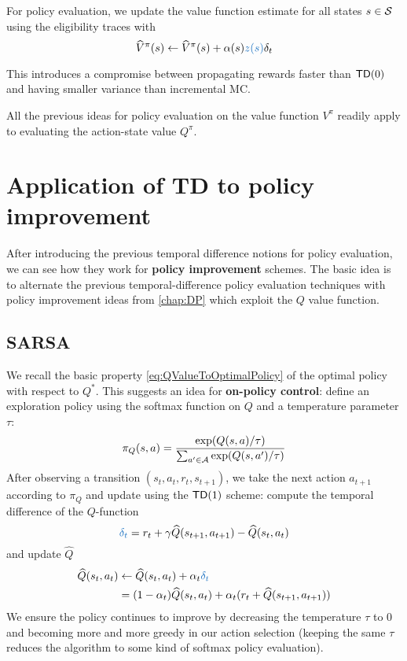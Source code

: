 \documentclass[../course-notes.tex]{subfiles}
\begin{document}
For policy evaluation, we update the value function estimate for all states $s\in\mathcal{S}$ using the eligibility traces with
\begin{equation}
	\widehat{V}^\pi(s) \leftarrow
	\widehat{V}^\pi(s) + \alpha(s){\bluefont z(s)}\delta_t
\end{equation}



This introduces a compromise between propagating rewards faster than $\mathsf{TD}(0)$ and having smaller variance than incremental MC.


\begin{remark}
	All the previous ideas for policy evaluation on the value function $V^\pi$ readily apply to evaluating the action-state value $Q^\pi$.
\end{remark}



\section{Application of TD to policy improvement}

After introducing the previous temporal difference notions for policy evaluation, we can see how they work for \textbf{policy improvement} schemes. The basic idea is to alternate the previous temporal-difference policy evaluation techniques with policy improvement ideas from \cref{chap:DP} which exploit the $Q$ value function.

\subsection{SARSA}

We recall the basic property \eqref{eq:QValueToOptimalPolicy} of the optimal policy with respect to $Q^*$. This suggests an idea for \textbf{on-policy control}: define an exploration policy using the softmax function on $Q$ and a temperature parameter $\tau$:
\[
	\pi_Q(s,a) =
	\frac{\exp(Q(s,a)/\tau)}{
		\sum_{a'\in\mathcal{A}} \exp(Q(s,a')/\tau)
	}
\]
After observing a transition $(s_t, a_t, r_t, s_{t+1})$, we take the next action $a_{t+1}$ according to $\pi_Q$ and update using the $\mathsf{TD}(1)$ scheme: compute the temporal difference of the $Q$-function
\begin{equation}\label{eq:QfuncTDerror}
	{\bluefont \delta_t} = r_t + \gamma \widehat{Q}(s_{t+1}, a_{t+1}) - \widehat{Q}(s_t, a_t)
\end{equation}
and update $\widehat{Q}$
\begin{equation*}
\begin{aligned}
	\widehat{Q}(s_t, a_t) &\leftarrow
	\widehat{Q}(s_t, a_t) + \alpha_t {\bluefont \delta_t}  \\
	&= (1-\alpha_t)\widehat{Q}(s_t, a_t)
	+ \alpha_t (r_t + \widehat{Q}(s_{t+1}, a_{t+1}))
\end{aligned}
\end{equation*}
We ensure the policy continues to improve by decreasing the temperature $\tau$ to 0 and becoming more and more greedy in our action selection (keeping the same $\tau$ reduces the algorithm to some kind of softmax policy evaluation).
\end{document}
